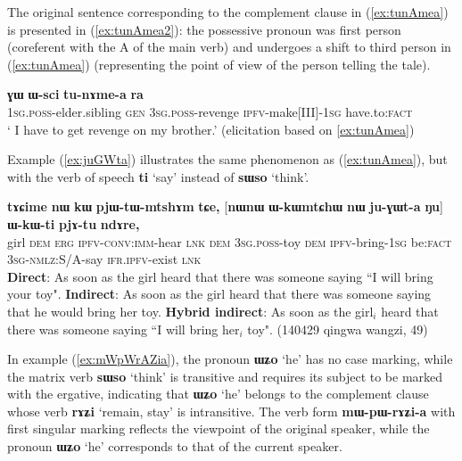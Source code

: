 \documentclass[oneside,a4paper,11pt]{article}
\newcommand{\ipa}[1]{\textbf{\phon#1}} %
\newcommand{\jpg}[2]{\ipa{#1} `#2'} %
\newcommand{\bleu}[1]{{\color{blue}#1}}
\newcommand{\rouge}[1]{{\color{red}#1}}
\newcommand{\refb}[1]{(\ref{#1})}
\begin{document}
The original sentence corresponding to the complement clause in \refb{ex:tunAmea} is presented in \refb{ex:tunAmea2}: the possessive pronoun was first person (coreferent with the A of the main verb) and undergoes a shift to third person in \refb{ex:tunAmea} (representing the point of view of the person telling the tale).

  \begin{exe}
\ex \label{ex:tunAmea2}
\gll \bleu{\ipa{a-pi}}  	\ipa{ɣɯ}  	\ipa{ɯ-sci}  	\bleu{\ipa{tu-nɤme-a}}  	\ipa{ra}	\\
 {\textsc{1sg.poss}-elder.sibling}  \textsc{gen} \textsc{3sg.poss}-revenge {\textsc{ipfv}-make[III]-\textsc{1sg}} have.to:\textsc{fact}  \\
\glt ` I have to get revenge on my brother.' (elicitation based on \ref{ex:tunAmea})
  \end{exe}
  
  Example \refb{ex:juGWta} illustrates the same phenomenon as \refb{ex:tunAmea}, but with the verb of speech \ipa{ti} `say' instead of \ipa{sɯso} `think'.
 
\begin{exe}
\ex \label{ex:juGWta}
\gll   \ipa{tɤɕime}  	\ipa{nɯ}  	\ipa{kɯ}  	\ipa{pjɯ-tɯ-mtshɤm}  	\ipa{tɕe,}  	[\ipa{nɯnɯ}  \rouge{\ipa{ɯ-kɯmtɕhɯ}}  	\ipa{nɯ}  	\bleu{\ipa{ju-ɣɯt-a}}  	\ipa{ŋu}]  		\ipa{ɯ-kɯ-ti}  	\ipa{pjɤ-tu}  	\ipa{ndɤre,}  \\
girl \textsc{dem} \textsc{erg} \textsc{ipfv-conv:imm}-hear \textsc{lnk} \textsc{dem} {\textsc{3sg.poss}-toy} \textsc{dem} {\textsc{ipfv}-bring-\textsc{1sg}}  be:\textsc{fact} \textsc{3sg-nmlz}:S/A-say \textsc{ifr.ipfv}-exist \textsc{lnk} \\
\glt   \textbf{Direct}: As soon as the girl heard that there was someone saying ``\bleu{I will bring your toy}".
\glt   \textbf{Indirect}:  As soon as the girl heard that there was someone saying that \rouge{he would bring her toy}.
\glt   \textbf{Hybrid indirect}: As soon as the girl$_i$ heard that there was someone saying ``\bleu{I will bring} \rouge{her$_i$ toy}". (140429 qingwa wangzi, 49)
  \end{exe}


In example \refb{ex:mWpWrAZia}, the pronoun \jpg{ɯʑo}{he} has no case marking, while the matrix verb \jpg{sɯso}{think} is transitive and requires its subject to be marked with the ergative, indicating that \jpg{ɯʑo}{he} belongs to the complement clause whose verb \jpg{rɤʑi}{remain, stay} is intransitive. The verb form \ipa{mɯ-pɯ-rɤʑi-a} with first singular marking reflects the viewpoint of the original speaker, while the pronoun \jpg{ɯʑo}{he} corresponds to that of the current speaker. 
  
\end{document}

